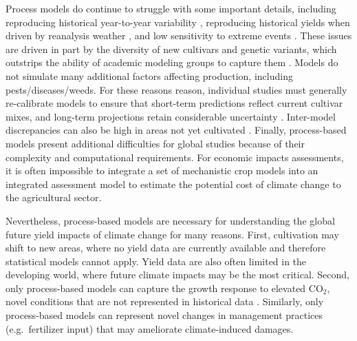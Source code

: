\documentclass[preprint, 5p, times, twocolumn]{elsarticle}
\begin{document}
Process models do continue to struggle with some important details, including reproducing historical year-to-year variability \citep[e.g.\ ][]{muller_global_2017}, reproducing historical yields when driven by reanalysis weather \citep[e.g.\ ][]{Glotter14}, and low sensitivity to extreme events \citep[e.g.\ ][]{Glotter15}. These issues are driven in part by the diversity of new cultivars and genetic variants, which outstrips the ability of academic modeling groups to capture them \citep[e.g.\ ][]{JONES2017b}. Models do not simulate many additional factors affecting production, including pests/diseases/weeds. For these reasons reason, individual studies must generally re-calibrate models to ensure that short-term predictions reflect current cultivar mixes, and long-term projections retain considerable uncertainty \citep{WOLF2002217, JAGTAP200273, ANGULO201332, Asseng2013, Asseng2015}. Inter-model discrepancies can also be high in areas not yet cultivated \citep[e.g.\ ][]{Challinor2014, WHITE2011357}. Finally, process-based models present additional difficulties for global studies because of their complexity and computational requirements. For economic impacts assessments, it is often impossible to integrate a set of mechanistic crop models into an integrated assessment model to estimate the potential cost of climate change to the agricultural sector.

Nevertheless, process-based models are necessary for understanding the global future yield impacts of climate change for many reasons. First, cultivation may shift to new areas, where no yield data are currently available and therefore statistical models cannot apply. Yield data are also often limited in the developing world, where future climate impacts may be the most critical.  Second, only process-based models can capture the growth response to elevated CO$_2$, novel conditions that are not represented in historical data \citep[e.g.\ ][]{pugh_climate_2016, Roberts2017}. Similarly, only process-based models can represent novel changes in management practices (e.g.\ fertilizer input) that may ameliorate climate-induced damages.
\end{document}
